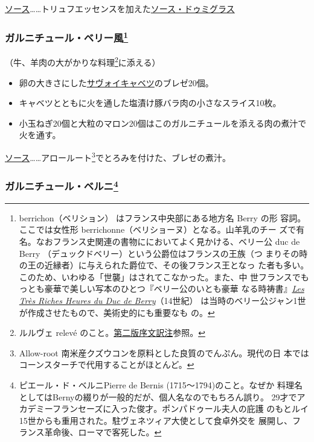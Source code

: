 \begin{recette}
\ul{ソース}\ldots{}\ldots{}トリュフエッセンスを加えた\protect\hyperlink{sauce-demi-glace}{ソース・ドゥミグラス}

\hypertarget{garniture-berrichonne}{%
\subsubsection[ガルニチュール・ベリー風]{\texorpdfstring{ガルニチュール・ベリー風\footnote{berrichon（ベリション）
  はフランス中央部にある地方名 Berry の形 容詞。ここでは女性形
  berrichonne（ベリショーヌ）となる。山羊乳のチー
  ズで有名。なおフランス史関連の書物ににおいてよく見かける、ベリー公 duc
  de Berry （デュックドベリー）という公爵位はフランスの王族（つ
  まりその時の王の近縁者）に与えられた爵位で、その後フランス王となっ
  た者も多い。このため、いわゆる「世襲」はされてこなかった。また、中
  世フランスでもっとも豪華で美しい写本のひとつ『ベリー公のいとも豪華
  なる時祷書』\href{http://gallica.bnf.fr/ark:/12148/btv1b520004510}{\emph{Les
  Très Riches Heures du Duc de Berry}}（14世紀）
  は当時のベリー公ジャン1世が作成させたもので、美術史的にも重要なも の。}}{ガルニチュール・ベリー風}}\label{garniture-berrichonne}}



（牛、羊肉の大がかりな料理\footnote{ルルヴェ relevé
  のこと。\protect\hyperlink{releve}{第二版序文訳注}参照。}に添える）

\begin{itemize}
\item
  卵の大きさにした\protect\hyperlink{chou-braise}{サヴォイキャベツ}のブレゼ20個。
\item
  キャベツとともに火を通した塩漬け豚バラ肉の小さなスライス10枚。
\item
  小玉ねぎ20個と大粒のマロン20個はこのガルニチュールを添える肉の煮汁で火を通す。
\end{itemize}

\ul{ソース}\ldots{}\ldots{}アロールート\footnote{Allow-root
  南米産クズウコンを原料とした良質のでんぷん。現代の日
  本ではコーンスターチで代用することがほとんど。}でとろみを付けた、ブレゼの煮汁。

\hypertarget{garniture-berny}{%
\subsubsection[ガルニチュール・ベルニ]{\texorpdfstring{ガルニチュール・ベルニ\footnote{ピエール・ド・ベルニPierre
  de Bernis (1715〜1794)のこと。なぜか
  料理名としてはBernyの綴りが一般的だが、個人名なのでもちろん誤り。
  29才でアカデミーフランセーズに入った俊才。ポンパドゥール夫人の庇護
  のもとルイ15世からも重用された。駐ヴェネツィア大使として食卓外交を
  展開し、フランス革命後、ローマで客死した。}}{ガルニチュール・ベルニ}}\label{garniture-berny}}


\end{recette}
